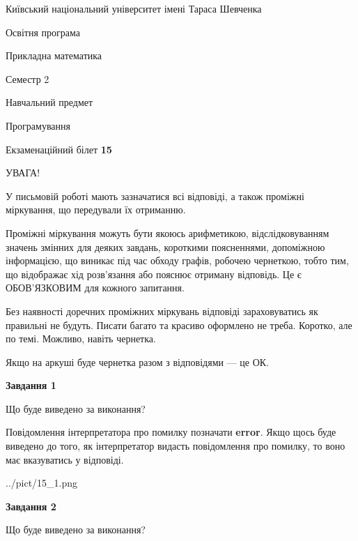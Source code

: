 \documentclass[12pt, ukrainian]{article}
\begin{document}
{{\begin {small}\par
{ \center  Київський національний університет імені Тараса Шевченка \par}
{\parbox {5 cm}{Освітня програма \hfill}{\parbox {7 cm}{Прикладна математика \hfill}}\parbox {6 cm}{\hfill Семестр 2}}\par
{\parbox {5 cm} {Навчальний предмет \hfill}\parbox {7 cm}{Програмування \hfill}\parbox {6cm}{\hfill}\par}\vspace{-7pt} \end{small}}{\center Екзаменаційний білет \No \textbf
{ 15 }\par}}
{
\begin {large}
УВАГА!

У письмовій роботі мають зазначатися всі відповіді, а також проміжні міркування, що передували їх отриманню.

Проміжні міркування можуть бути якоюсь арифметикою, відслідковуванням зна\-чень змінних для деяких завдань,
короткими поясненнями, допоміжною інформацією, що виникає під час обходу графів, робочею чернеткою,
тобто тим, що відображає хід розв’язання або пояснює отриману відповідь.
Це є ОБОВ’ЯЗКОВИМ для кожного запитання.

Без наявності доречних проміжних міркувань відповіді зараховуватись як правиль\-ні не будуть.
Писати багато та красиво оформлено не треба. Коротко, але по темі. Можли\-во, навіть чернетка.

Якщо на аркуші буде чернетка разом з відповідями --- це ОК.

\newpage

{\begin {center}\textbf{Завдання 1}\end {center}}\par
Що буде виведено за виконання?

Повідомлення інтерпретатора про помилку позначати \textbf{error}.
Якщо щось буде виведено до того, як інтерпретатор видасть повідомлення про помилку, 
то воно має вказуватись у відповіді. \par


\begin{center}
	{../pict/15_1.png}
\end{center}
\newpage

{\begin {center}\textbf{Завдання 2}\end {center}}\par
Що буде виведено за виконання?


\end{large}}
\end{document}
